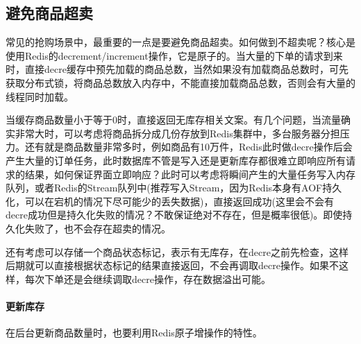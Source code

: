 \documentclass[../../../interview-questions.tex]{subfiles}
\begin{document}
\subsection{避免商品超卖}

常见的抢购场景中，最重要的一点是要避免商品超卖。如何做到不超卖呢？核心是使用Redis的decrement/increment操作，它是原子的。当大量的下单的请求到来时，直接decre缓存中预先加载的商品总数，当然如果没有加载商品总数时，可先获取分布式锁，将商品总数放入内存中，不能直接加载商品总数，否则会有大量的线程同时加载。

当缓存商品数量小于等于0时，直接返回无库存相关文案。有几个问题，当流量确实非常大时，可以考虑将商品拆分成几份存放到Redis集群中，多台服务器分担压力。还有就是商品数量非常多时，例如商品有10万件，Redis此时做decre操作后会产生大量的订单任务，此时数据库不管是写入还是更新库存都很难立即响应所有请求的结果，如何保证界面立即响应？此时可以考虑将瞬间产生的大量任务写入内存队列，或者Redis的Stream队列中(推荐写入Stream，因为Redis本身有AOF持久化，可以在宕机的情况下尽可能少的丢失数据)，直接返回成功(这里会不会有decre成功但是持久化失败的情况？不敢保证绝对不存在，但是概率很低)。即使持久化失败了，也不会存在超卖的情况。

还有考虑可以存储一个商品状态标记，表示有无库存，在decre之前先检查，这样后期就可以直接根据状态标记的结果直接返回，不会再调取decre操作。如果不这样，每次下单还是会继续调取decre操作，存在数据溢出可能。

\paragraph{更新库存}

在后台更新商品数量时，也要利用Redis原子增操作的特性。
\end{document}
